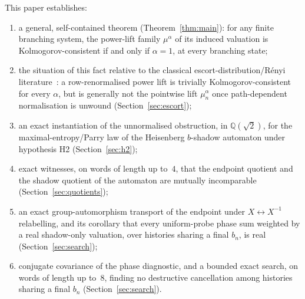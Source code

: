 \documentclass[11pt,a4paper]{article}
\theoremstyle{definition}
\theoremstyle{remark}
\newcommand{\Q}{\mathbb{Q}}
\newcommand{\Qroot}{\Q(\sqrt{2})}
\begin{document}
This paper establishes:
\begin{enumerate}[label=(\roman*)]
  \item a general, self-contained theorem (Theorem~\ref{thm:main}): for any finite
  branching system, the power-lift family $\mu^\alpha$ of its induced valuation is
  Kolmogorov-consistent if and only if $\alpha=1$, at every branching state;
  \item the situation of this fact relative to the classical escort-distribution/R\'enyi
  literature~\cite{Abe2000,TsallisPlastinoAlvarezEstrada2009}: a row-renormalised power
  lift is trivially Kolmogorov-consistent for every $\alpha$, but is generally not the
  pointwise lift $\mu_n^\alpha$ once path-dependent normalisation is unwound
  (Section~\ref{sec:escort});
  \item an exact instantiation of the unnormalised obstruction, in $\Qroot$, for the
  maximal-entropy/Parry law of the Heisenberg $b$-shadow automaton under hypothesis
  \textup{H2} (Section~\ref{sec:h2});
  \item exact witnesses, on words of length up to~$4$, that the endpoint quotient and the
  shadow quotient of the automaton are mutually incomparable (Section~\ref{sec:quotients});
  \item an exact group-automorphism transport of the endpoint under $X\leftrightarrow
  X^{-1}$ relabelling, and its corollary that every uniform-probe phase sum weighted by a
  real shadow-only valuation, over histories sharing a final $b_n$, is real
  (Section~\ref{sec:search});
  \item conjugate covariance of the phase diagnostic, and a bounded exact search, on
  words of length up to~$8$, finding no destructive cancellation among histories sharing
  a final $b_n$ (Section~\ref{sec:search}).
\end{enumerate}
\end{document}
